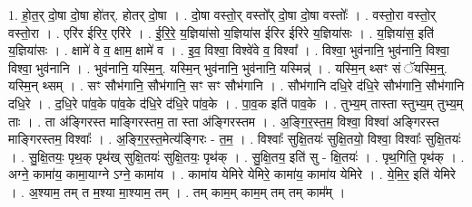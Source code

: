 \documentclass[17pt]{extarticle}
\begin{document}
1. हो॒त॒र् दो॒षा दो॒षा हो॑तर्. होतर् दो॒षा । . दो॒षा वस्तो॒र् वस्तो᳚र् दो॒षा दो॒षा वस्तोः᳚ । . वस्तो॒रा वस्तो॒र् वस्तो॒रा । . एरि॑र ईरिर॒ एरि॑रे । . ई॒रि॒रे॒ य॒ज्ञिया॑सो य॒ज्ञिया॑स ईरिर ईरिरे य॒ज्ञिया॑सः । . य॒ज्ञिया॑स॒ इति॑ य॒ज्ञिया॑सः । . क्षामे॑ वे व॒ क्षाम॒ क्षामे॑ व । . इ॒व॒ विश्वा॒ विश्वे॑वे व॒ विश्वा᳚ । . विश्वा॒ भुव॑नानि॒ भुव॑नानि॒ विश्वा॒ विश्वा॒ भुव॑नानि । . भुव॑नानि॒ यस्मि॒न्॒. यस्मि॒न् भुव॑नानि॒ भुव॑नानि॒ यस्मिन्न्॑ । . यस्मि॒न् थ्सꣳ सं ॅयस्मि॒न्॒. यस्मि॒न् थ्सम् । . सꣳ सौभ॑गानि॒ सौभ॑गानि॒ सꣳ सꣳ सौभ॑गानि । . सौभ॑गानि दधि॒रे द॑धि॒रे सौभ॑गानि॒ सौभ॑गानि दधि॒रे । . द॒धि॒रे पा॑व॒के पा॑व॒के द॑धि॒रे द॑धि॒रे पा॑व॒के । . पा॒व॒क इति॑ पाव॒के । . तुभ्य॒म् तास्ता स्तुभ्य॒म् तुभ्य॒म् ताः । . ता अ॑ङ्गिरस्त माङ्गिरस्तम॒ ता स्ता अ॑ङ्गिरस्तम । . अ॒ङ्गि॒र॒स्त॒म॒ विश्वा॒ विश्वा॑ अङ्गिरस्त माङ्गिरस्तम॒ विश्वाः᳚ । . अ॒ङ्गि॒र॒स्त॒मेत्य॑ङ्गिरः - त॒म॒ । . विश्वाः᳚ सुक्षि॒तयः॑ सुक्षि॒तयो॒ विश्वा॒ विश्वाः᳚ सुक्षि॒तयः॑ । . सु॒क्षि॒तयः॒ पृथ॒क् पृथ॑ख् सुक्षि॒तयः॑ सुक्षि॒तयः॒ पृथ॑क् । . सु॒क्षि॒तय॒ इति॑ सु - क्षि॒तयः॑ । . पृथ॒गिति॒ पृथ॑क् । . अग्ने॒ कामा॑य॒ कामा॒याग्ने ऽग्ने॒ कामा॑य । . कामा॑य येमिरे येमिरे॒ कामा॑य॒ कामा॑य येमिरे । . ये॒मि॒र॒ इति॑ येमिरे । . अ॒श्याम॒ तम् त म॒श्या मा॒श्याम॒ तम् । . तम् काम॒म् काम॒म् तम् तम् काम᳚म् । \newline
\end{document}
